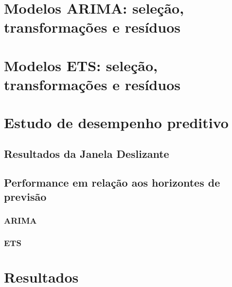 \documentclass[
  letterpaper,
  DIV=11,
  numbers=noendperiod]{scrartcl}
\begin{document}
\hypertarget{modelos-arima-seleuxe7uxe3o-transformauxe7uxf5es-e-resuxedduos}{%
\section{Modelos ARIMA: seleção, transformações e
resíduos}\label{modelos-arima-seleuxe7uxe3o-transformauxe7uxf5es-e-resuxedduos}}

\hypertarget{modelos-ets-seleuxe7uxe3o-transformauxe7uxf5es-e-resuxedduos}{%
\section{Modelos ETS: seleção, transformações e
resíduos}\label{modelos-ets-seleuxe7uxe3o-transformauxe7uxf5es-e-resuxedduos}}

\hypertarget{estudo-de-desempenho-preditivo}{%
\section{Estudo de desempenho
preditivo}\label{estudo-de-desempenho-preditivo}}

\hypertarget{resultados-da-janela-deslizante}{%
\subsection{Resultados da Janela
Deslizante}\label{resultados-da-janela-deslizante}}

\hypertarget{performance-em-relauxe7uxe3o-aos-horizontes-de-previsuxe3o}{%
\subsection{Performance em relação aos horizontes de
previsão}\label{performance-em-relauxe7uxe3o-aos-horizontes-de-previsuxe3o}}

\hypertarget{arima}{%
\subsubsection{ARIMA}\label{arima}}

\hypertarget{ets}{%
\subsubsection{ETS}\label{ets}}

\hypertarget{resultados}{%
\section{Resultados}\label{resultados}}
\end{document}
